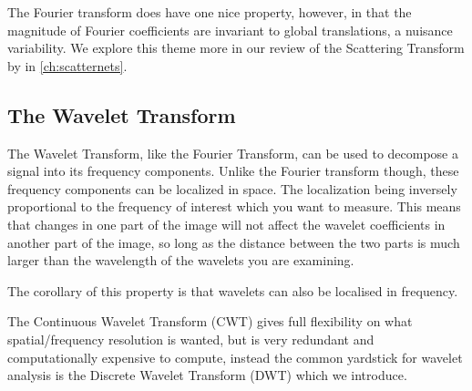   The Fourier transform does have one nice property, however, in that the magnitude of
  Fourier coefficients are invariant to global translations, a nuisance
  variability. We explore this theme more in our review of the Scattering
  Transform by \Mallat in \autoref{ch:scatternets}.

\subsection{The Wavelet Transform}
  The Wavelet Transform, like the Fourier Transform, can be used to decompose
  a signal into its frequency components. Unlike the Fourier transform though,
  these frequency components can be localized in space. The localization
  being inversely proportional to the frequency of interest which you want to
  measure. This means that changes in one part of the image will not affect the
  wavelet coefficients in another part of the image, so long as the distance
  between the two parts is much larger than the wavelength of the wavelets you
  are examining.

  The corollary of this property is that wavelets can also be localised in
  frequency.

  The Continuous Wavelet Transform (CWT) gives full flexibility on what
  spatial/frequency resolution is wanted, but is very redundant and
  computationally expensive to compute, instead the common yardstick for
  wavelet analysis is the Discrete Wavelet Transform (DWT) which we introduce.

% 
